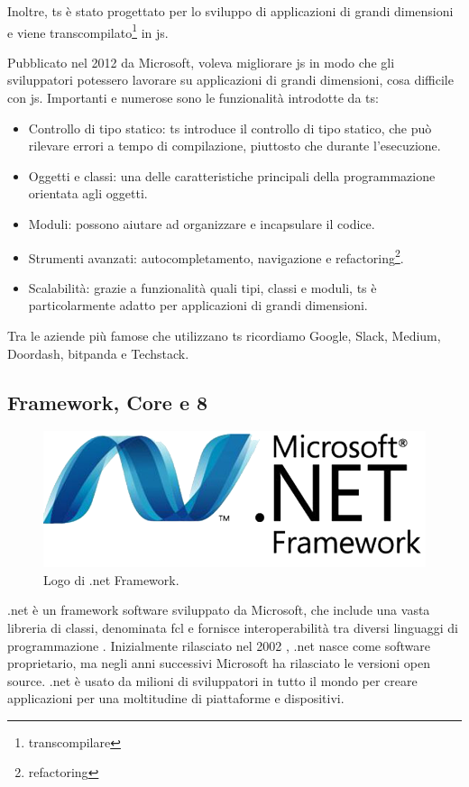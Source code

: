 Inoltre, \acrlong{ts} è stato progettato per lo sviluppo di applicazioni di grandi dimensioni e viene transcompilato\footnote{\glsdesc{transcompilare}} in \acrlong{js}.

Pubblicato nel 2012 da Microsoft, voleva migliorare \acrlong{js} in modo che gli sviluppatori potessero lavorare su applicazioni di grandi dimensioni, cosa difficile con \acrlong{js}. Importanti e numerose sono le funzionalità introdotte da \acrlong{ts}:
\begin{itemize}
    \item Controllo di tipo statico: \acrlong{ts} introduce il controllo di tipo statico, che può rilevare errori a tempo di compilazione, piuttosto che durante l'esecuzione.
    \item Oggetti e classi: una delle caratteristiche principali della programmazione orientata agli oggetti.
    \item Moduli: possono aiutare ad organizzare e incapsulare il codice.
    \item Strumenti avanzati: autocompletamento, navigazione e refactoring\footnote{\glsdesc{refactoring}}.
    \item Scalabilità: grazie a funzionalità quali tipi, classi e moduli, \acrlong{ts} è particolarmente adatto per applicazioni di grandi dimensioni.
\end{itemize}

Tra le aziende più famose che utilizzano \acrlong{ts} ricordiamo Google, Slack, Medium, Doordash, bitpanda e Techstack.


 
\subsection{ Framework,  Core e  8}\label{sec:.net} 
\begin{figure}[H]
\centering
\includegraphics[width=.7\textwidth]{Images/net.png}
\caption{\label{fig:.net}Logo di \gls{.net} Framework.}
\end{figure}
\gls{.net} \cite{dotnet} è un \gls{framework} \gls{software} sviluppato da Microsoft, che include una vasta libreria di classi, denominata \acrlong{fcl} e fornisce interoperabilità tra diversi linguaggi di programmazione \cite{.net}.
Inizialmente rilasciato nel 2002 \cite{.netHistory}, \gls{.net} nasce come software proprietario, ma negli anni successivi Microsoft ha rilasciato le versioni \gls{open source}.
\gls{.net} \cite{dotnetVideos} è usato da milioni di sviluppatori in tutto il mondo per creare applicazioni per una moltitudine di piattaforme e dispositivi.

